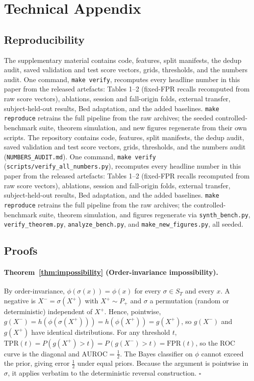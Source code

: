 

\clearpage
\appendix
\onecolumn
\section{Technical Appendix}

\subsection{Reproducibility}
\ifnum{}
The supplementary material contains code, features, split manifests, the dedup audit, saved validation and test score vectors, grids, thresholds, and the numbers audit. One command, \texttt{make verify}, recomputes every headline number in this paper from the released artefacts: Tables 1--2 (fixed-FPR recalls recomputed from raw score vectors), ablations, session and fall-origin folds, external transfer, subject-held-out results, Bed adaptation, and the added baselines. \texttt{make reproduce} retrains the full pipeline from the raw archives; the seeded controlled-benchmark suite, theorem simulation, and new figures regenerate from their own scripts.
\else
The repository contains code, features, split manifests, the dedup audit, saved validation and test score vectors, grids, thresholds, and the numbers audit (\texttt{NUMBERS\string_AUDIT.md}). One command, \texttt{make verify} (\texttt{scripts/verify\string_all\string_numbers.py}), recomputes every headline number in this paper from the released artefacts: Tables 1--2 (fixed-FPR recalls recomputed from raw score vectors), ablations, session and fall-origin folds, external transfer, subject-held-out results, Bed adaptation, and the added baselines. \texttt{make reproduce} retrains the full pipeline from the raw archives; the controlled-benchmark suite, theorem simulation, and figures regenerate via \texttt{synth\string_bench.py}, \texttt{verify\string_theorem.py}, \texttt{analyze\string_bench.py}, and \texttt{make\string_new\string_figures.py}, all seeded.
\fi

\subsection{Proofs}
\paragraph{Theorem~\ref{thm:impossibility} (Order-invariance impossibility).}
By order-invariance, $\phi(\sigma(x))=\phi(x)$ for every $\sigma\in S_T$ and every $x$. A negative is $X^-=\sigma(X^+)$ with $X^+\sim P_+$ and $\sigma$ a permutation (random or deterministic) independent of $X^+$. Hence, pointwise, $g(X^-)=h(\phi(\sigma(X^+)))=h(\phi(X^+))=g(X^+)$, so $g(X^-)$ and $g(X^+)$ have identical distributions. For any threshold $t$, $\mathrm{TPR}(t)=P(g(X^+)>t)=P(g(X^-)>t)=\mathrm{FPR}(t)$, so the ROC curve is the diagonal and $\mathrm{AUROC}=\tfrac12$. The Bayes classifier on $\phi$ cannot exceed the prior, giving error $\tfrac12$ under equal priors. Because the argument is pointwise in $\sigma$, it applies verbatim to the deterministic reversal construction. \hfill$\square$

